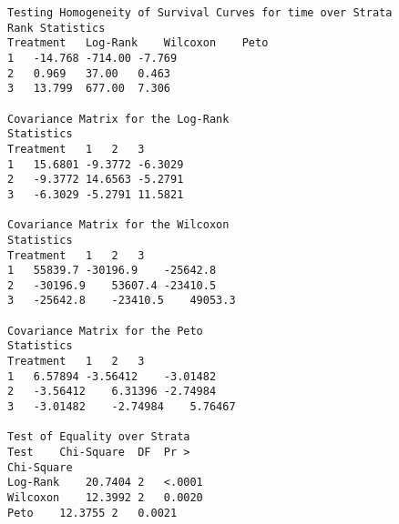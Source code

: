 \documentclass[11pt]{article}
\numberwithin{figure}{section}
\begin{document}
\begin{verbatim}
Testing Homogeneity of Survival Curves for time over Strata
Rank Statistics
Treatment	Log-Rank	Wilcoxon	Peto
1	-14.768	-714.00	-7.769
2	0.969	37.00	0.463
3	13.799	677.00	7.306

Covariance Matrix for the Log-Rank
Statistics
Treatment	1	2	3
1	15.6801	-9.3772	-6.3029
2	-9.3772	14.6563	-5.2791
3	-6.3029	-5.2791	11.5821

Covariance Matrix for the Wilcoxon
Statistics
Treatment	1	2	3
1	55839.7	-30196.9	-25642.8
2	-30196.9	53607.4	-23410.5
3	-25642.8	-23410.5	49053.3

Covariance Matrix for the Peto
Statistics
Treatment	1	2	3
1	6.57894	-3.56412	-3.01482
2	-3.56412	6.31396	-2.74984
3	-3.01482	-2.74984	5.76467

Test of Equality over Strata
Test	Chi-Square	DF	Pr >
Chi-Square
Log-Rank	20.7404	2	<.0001
Wilcoxon	12.3992	2	0.0020
Peto	12.3755	2	0.0021


 


\end{verbatim}
\end{document}
